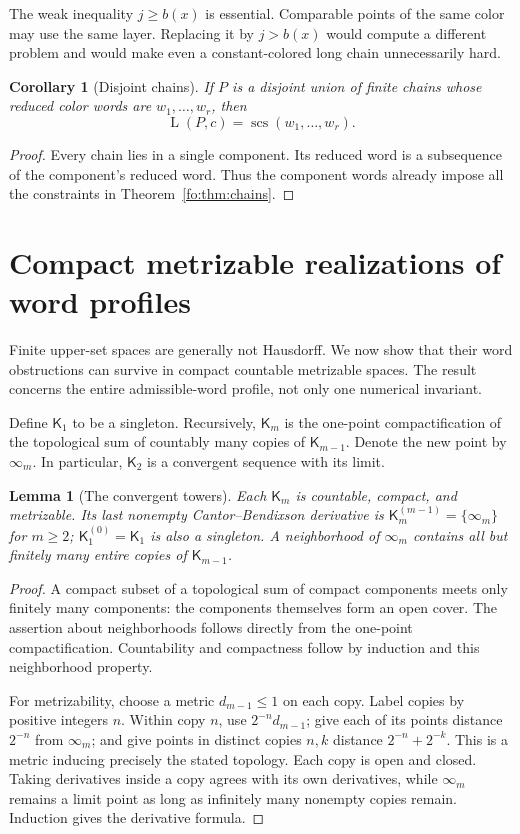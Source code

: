 \documentclass[11pt,letterpaper]{article}
\numberwithin{equation}{section}
\newtheorem{lemma}[lemma]{Lemma}
\newtheorem{corollary}[corollary]{Corollary}
\theoremstyle{definition}
\theoremstyle{remark}
\theoremstyle{definition}
\newcommand{\scs}{\operatorname{scs}}
\newcommand{\layers}{\operatorname{L}}
\newcommand{\Tw}{\mathsf K}
\begin{document}
The weak inequality $j\ge b(x)$ is essential. Comparable points of the same
color may use the same layer. Replacing it by $j>b(x)$ would compute a different
problem and would make even a constant-colored long chain unnecessarily hard.

\begin{corollary}[Disjoint chains]\label{fo:cor:chain-union}
If $P$ is a disjoint union of finite chains whose reduced color words are
$w_1,\ldots,w_r$, then
\[
 \layers(P,c)=\scs(w_1,\ldots,w_r).
\]
\end{corollary}
\begin{proof}
Every chain lies in a single component. Its reduced word is a subsequence of
the component's reduced word. Thus the component words already impose all the
constraints in Theorem~\ref{fo:thm:chains}.
\end{proof}

\section{Compact metrizable realizations of word profiles}
\label{fo:sec:compact}

Finite upper-set spaces are generally not Hausdorff. We now show that their
word obstructions can survive in compact countable metrizable spaces.
The result concerns the entire admissible-word profile, not only one numerical
invariant.

Define $\Tw_1$ to be a singleton. Recursively, $\Tw_m$ is the one-point
compactification of the topological sum of countably many copies of $\Tw_{m-1}$.
Denote the new point by $\infty_m$. In particular, $\Tw_2$ is a convergent sequence
with its limit.

\begin{lemma}[The convergent towers]\label{fo:lem:towers}
Each $\Tw_m$ is countable, compact, and metrizable. Its last nonempty
Cantor--Bendixson derivative is $\Tw_m^{(m-1)}=\{\infty_m\}$ for $m\ge2$;
$\Tw_1^{(0)}=\Tw_1$ is also a singleton. A neighborhood of $\infty_m$ contains all
but finitely many entire copies of $\Tw_{m-1}$.
\end{lemma}
\begin{proof}
A compact subset of a topological sum of compact components meets only finitely
many components: the components themselves form an open cover. The assertion
about neighborhoods follows directly from the one-point compactification.
Countability and compactness follow by induction and this neighborhood
property.

For metrizability, choose a metric $d_{m-1}\le1$ on each copy. Label copies by
positive integers $n$. Within copy $n$, use $2^{-n}d_{m-1}$; give each of its
points distance $2^{-n}$ from $\infty_m$; and give points in distinct copies
$n,k$ distance $2^{-n}+2^{-k}$. This is a metric inducing precisely the stated
topology. Each copy is open and closed. Taking derivatives inside a copy agrees
with its own derivatives, while $\infty_m$ remains a limit point as long as
infinitely many nonempty copies remain. Induction gives the derivative formula.
\end{proof}
\end{document}
